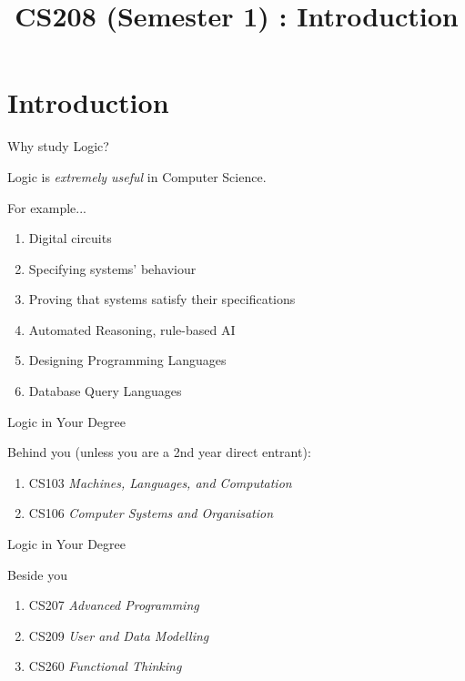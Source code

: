 \documentclass[xetex,aspectratio=169,14pt,hyperref={pdfpagelabels=true,pdflang={en-GB}}]{beamer}
\title[CS208 - Introduction]{CS208 (Semester 1) : Introduction}
\begin{document}
\maketitle

\section{Introduction}

\begin{frame}
  {Why study Logic?}

  Logic is \emph{extremely useful} in Computer Science.

  \bigskip

  For example...
  \begin{enumerate}
  \item Digital circuits
  \item Specifying systems' behaviour
  \item Proving that systems satisfy their specifications
  \item Automated Reasoning, rule-based AI
  \item Designing Programming Languages
  \item Database Query Languages
  \end{enumerate}
\end{frame}

\begin{frame}
  {Logic in Your Degree}

  Behind you (unless you are a 2nd year direct entrant):
  \begin{enumerate}
  \item CS103 \emph{Machines, Languages, and Computation}
  \item CS106 \emph{Computer Systems and Organisation}
  \end{enumerate}
\end{frame}

\begin{frame}
  {Logic in Your Degree}

  Beside you
  \begin{enumerate}
  \item CS207 \emph{Advanced Programming}
  \item CS209 \emph{User and Data Modelling}
  \item CS260 \emph{Functional Thinking}
  \end{enumerate}
\end{frame}
\end{document}
